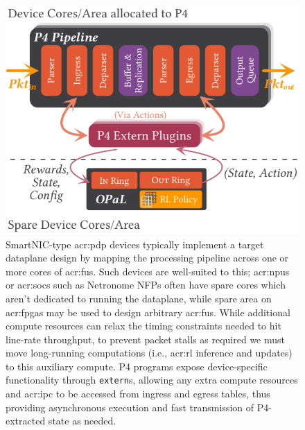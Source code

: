 \begin{figure}
	\centering
	\includegraphics[keepaspectratio, width=0.85\linewidth]{diagrams/opal/arch-with-p4}
	\caption[\approachshort{}'s off-path interaction model with respect to a co-hosted P4 dataplane.]{SmartNIC-type \gls{acr:pdp} devices typically implement a target dataplane design by mapping the processing pipeline across one or more cores of \glspl{acr:fu}. Such devices are well-suited to this; \glspl{acr:npu} or \glspl{acr:soc} such as Netronome NFPs often have spare cores which aren't dedicated to running the dataplane, while spare area on \glspl{acr:fpga} may be used to design arbitrary \glspl{acr:fu}. While additional compute resources can relax the timing constraints needed to hit line-rate throughput, to prevent packet stalls as required we must move long-running computations (i.e., \gls{acr:rl} inference and updates) to this auxiliary compute. P4 programs expose device-specific functionality through \texttt{extern}s, allowing any extra compute resources and \gls{acr:ipc} to be accessed from ingress and egress tables, thus providing asynchronous execution and fast transmission of P4-extracted state as needed.\label{fig:netro-arch}}
\end{figure}

%
%
%

